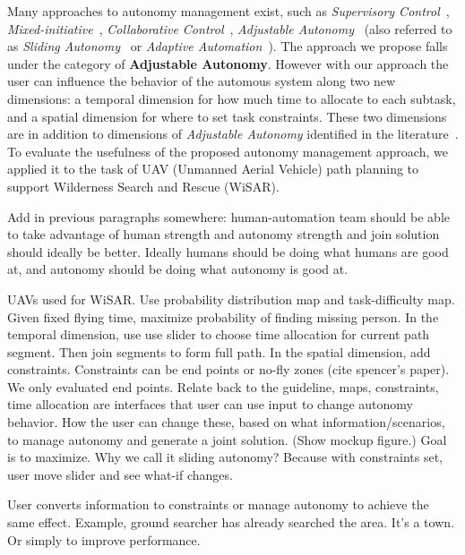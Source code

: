 \documentclass[journal]{IEEEtran}
\begin{document}
Many approaches to autonomy management exist, such as \textit{Supervisory Control}~\cite{Sheridan1992Telerobotics}, \textit{Mixed-initiative}~\cite{Hearst1999Mixed}, \textit{Collaborative Control}~\cite{Fong1999Collaborative}, \textit{Adjustable Autonomy}~\cite{Dorais1998AdjustableAutonomy,Dorais2001Designing} (also referred to as \textit{Sliding Autonomy}~\cite{Dias2008SlidingAutonomy} or \textit{Adaptive Automation}~\cite{Rouse1988Adaptive,Kaber2001Design}). The approach we propose falls under the category of \textbf{Adjustable Autonomy}. However with our approach the user can influence the behavior of the automous system along two new dimensions: a temporal dimension for how much time to allocate to each subtask, and a spatial dimension for where to set task constraints. These two dimensions are in addition to dimensions of \textit{Adjustable Autonomy} identified in the literature~\cite{Bradshaw2004Dimensions}. To evaluate the usefulness of the proposed autonomy management approach, we applied it to the task of UAV (Unmanned Aerial Vehicle) path planning to support Wilderness Search and Rescue (WiSAR).

Add in previous paragraphs somewhere: human-automation team should be able to take advantage of human strength and autonomy strength and join solution should ideally be better. Ideally humans should be doing what humans are good at, and autonomy should be doing what autonomy is good at.

UAVs used for WiSAR. 
Use probability distribution map and task-difficulty map.
Given fixed flying time, maximize probability of finding missing person.
In the temporal dimension, use use slider to choose time allocation for current path segment. Then join segments to form full path.
In the spatial dimension, add constraints. Constraints can be end points or no-fly zones (cite spencer's paper). We only evaluated end points.
Relate back to the guideline, maps, constraints, time allocation are interfaces that user can use input to change autonomy behavior.
How the user can change these, based on what information/scenarios, to manage autonomy and generate a joint solution. (Show mockup figure.) Goal is to maximize.
Why we call it sliding autonomy? Because with constraints set, user move slider and see what-if changes.

User converts information to constraints or manage autonomy to achieve the same effect. Example, ground searcher has already searched the area. It's a town.
Or simply to improve performance.
\end{document}
